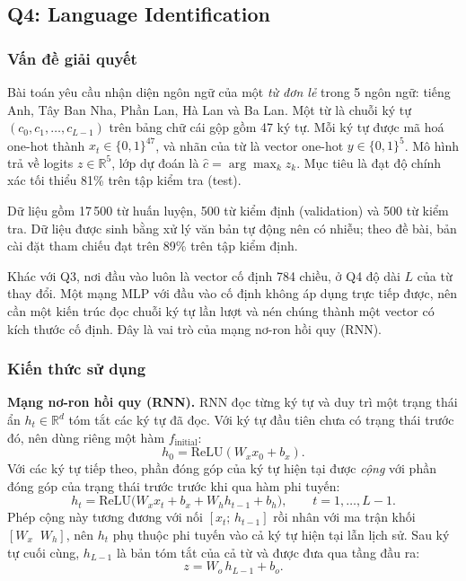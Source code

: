 \subsection{Q4: Language Identification}

\subsubsection{Vấn đề giải quyết}
Bài toán yêu cầu nhận diện ngôn ngữ của một \emph{từ đơn lẻ} trong 5 ngôn ngữ:
tiếng Anh, Tây Ban Nha, Phần Lan, Hà Lan và Ba Lan. Một từ là chuỗi ký tự
$(c_0, c_1, \dots, c_{L-1})$ trên bảng chữ cái gộp gồm 47 ký tự. Mỗi ký tự được
mã hoá one-hot thành $x_t \in \{0,1\}^{47}$, và nhãn của từ là vector one-hot
$y \in \{0,1\}^{5}$. Mô hình trả về logits $z \in \mathbb{R}^{5}$, lớp dự đoán là
$\hat{c} = \arg\max_k z_k$. Mục tiêu là đạt độ chính xác tối thiểu 81\% trên
tập kiểm tra (test).

Dữ liệu gồm 17\,500 từ huấn luyện, 500 từ kiểm định (validation) và 500 từ
kiểm tra. Dữ liệu được sinh bằng xử lý văn bản tự động nên có nhiễu; theo đề bài,
bản cài đặt tham chiếu đạt trên 89\% trên tập kiểm định.

Khác với Q3, nơi đầu vào luôn là vector cố định 784 chiều, ở Q4 độ dài $L$ của
từ thay đổi. Một mạng MLP với đầu vào cố định không áp dụng trực tiếp được, nên
cần một kiến trúc đọc chuỗi ký tự lần lượt và nén chúng thành một vector có
kích thước cố định. Đây là vai trò của mạng nơ-ron hồi quy (RNN).

\subsubsection{Kiến thức sử dụng}

\textbf{Mạng nơ-ron hồi quy (RNN).} RNN đọc từng ký tự và duy trì một trạng thái
ẩn $h_t \in \mathbb{R}^{d}$ tóm tắt các ký tự đã đọc. Với ký tự đầu tiên chưa có
trạng thái trước đó, nên dùng riêng một hàm $f_{\text{initial}}$:
\begin{equation}
h_0 = \mathrm{ReLU}(W_x x_0 + b_x).
\end{equation}
Với các ký tự tiếp theo, phần đóng góp của ký tự hiện tại được \emph{cộng} với
phần đóng góp của trạng thái trước trước khi qua hàm phi tuyến:
\begin{equation}
h_t = \mathrm{ReLU}\bigl(W_x x_t + b_x + W_h h_{t-1} + b_h\bigr),
\qquad t = 1, \dots, L-1.
\end{equation}
Phép cộng này tương đương với nối $[x_t;\, h_{t-1}]$ rồi nhân với ma trận khối
$[W_x \;\; W_h]$, nên $h_t$ phụ thuộc phi tuyến vào cả ký tự hiện tại lẫn lịch sử.
Sau ký tự cuối cùng, $h_{L-1}$ là bản tóm tắt của cả từ và được đưa qua tầng đầu
ra:
\begin{equation}
z = W_o\, h_{L-1} + b_o.
\end{equation}

